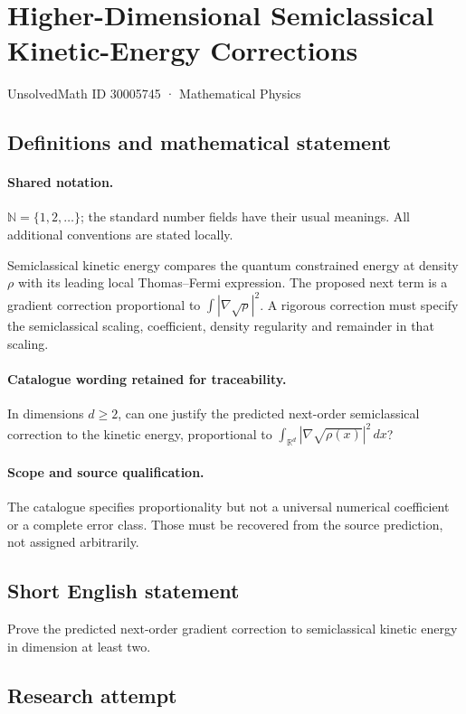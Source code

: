 \documentclass[11pt]{article}
\begin{document}
\setcounter{section}{30005744}
\section{Higher-Dimensional Semiclassical Kinetic-Energy Corrections}\label{30005745}
{\small UnsolvedMath ID 30005745 · Mathematical Physics}
\subsection{Definitions and mathematical statement}

\paragraph{Shared notation.}$\mathbb N=\{1,2,\ldots\}$; the standard number fields have their usual meanings. All additional conventions are stated locally.


Semiclassical kinetic energy compares the quantum constrained energy at density $\rho$ with its leading local Thomas--Fermi expression. The proposed next term is a gradient correction proportional to $\int|\nabla\sqrt\rho|^2$. A rigorous correction must specify the semiclassical scaling, coefficient, density regularity and remainder in that scaling.

\paragraph{Catalogue wording retained for traceability.}
In dimensions $d\geq2$, can one justify the predicted next-order semiclassical correction to the kinetic energy, proportional to $\int_{\mathbb{R}^d}|\nabla\sqrt{\rho(x)}|^2\,dx$?

\paragraph{Scope and source qualification.}The catalogue specifies proportionality but not a universal numerical coefficient or a complete error class. Those must be recovered from the source prediction, not assigned arbitrarily.
\subsection{Short English statement}
Prove the predicted next-order gradient correction to semiclassical kinetic energy in dimension at least two.
\subsection{Research attempt}
\end{document}
